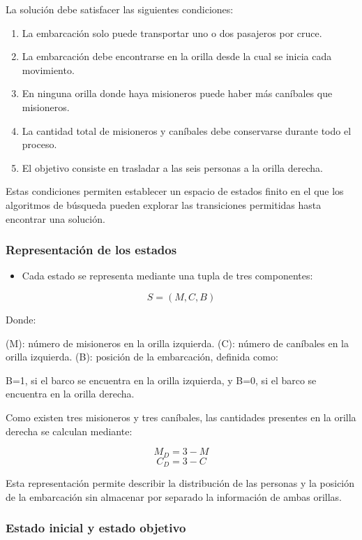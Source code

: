 \documentclass[
  spanish,
]{llncs}
\providecommand{\tightlist}{%
  \setlength{\itemsep}{0pt}\setlength{\parskip}{0pt}}
\begin{document}
La solución debe satisfacer las siguientes condiciones:

\begin{enumerate}
\def\labelenumi{\arabic{enumi}.}
\tightlist
\item
  La embarcación solo puede transportar uno o dos pasajeros por cruce.
\item
  La embarcación debe encontrarse en la orilla desde la cual se inicia
  cada movimiento.
\item
  En ninguna orilla donde haya misioneros puede haber más caníbales que
  misioneros.
\item
  La cantidad total de misioneros y caníbales debe conservarse durante
  todo el proceso.
\item
  El objetivo consiste en trasladar a las seis personas a la orilla
  derecha.
\end{enumerate}

Estas condiciones permiten establecer un espacio de estados finito en el
que los algoritmos de búsqueda pueden explorar las transiciones
permitidas hasta encontrar una solución.

\subsubsection{Representación de los
estados}\label{representaciuxf3n-de-los-estados}

\begin{itemize}
\tightlist
\item
  Cada estado se representa mediante una tupla de tres componentes:
\end{itemize}

\[
S=(M,C,B)
\]

Donde:

(M): número de misioneros en la orilla izquierda. (C): número de
caníbales en la orilla izquierda. (B): posición de la embarcación,
definida como:

B=1, si el barco se encuentra en la orilla izquierda, y B=0, si el barco
se encuentra en la orilla derecha.

Como existen tres misioneros y tres caníbales, las cantidades presentes
en la orilla derecha se calculan mediante:

\[
M_D=3-M
\] \[
C_D=3-C
\]

Esta representación permite describir la distribución de las personas y
la posición de la embarcación sin almacenar por separado la información
de ambas orillas.

\subsubsection{Estado inicial y estado
objetivo}\label{estado-inicial-y-estado-objetivo}
\end{document}
